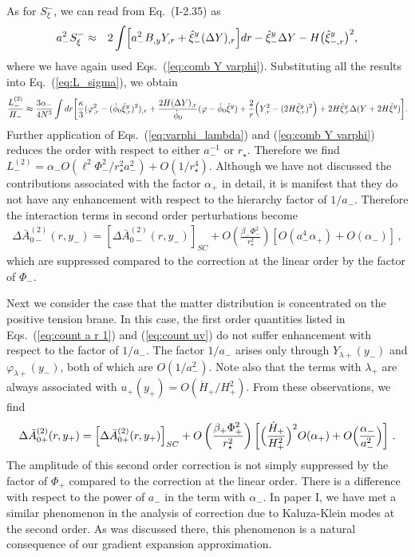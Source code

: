\documentclass[a4paper,showpacs,preprintnumbers,amsmath,amssymb]{revtex4}
\begin{document}
As for $S_\xi^-$, we can read from Eq.~(I-2.35) as 
\begin{eqnarray}
 a_{-}^2S_\xi^-
&\approx & 
 2  \int \Bigl[ a_{-}^2  B_{,y} Y_{,r}  
 + \hat \xi^y_- (\Delta Y)_{,r} \Bigr] dr 
 -   \hat\xi_{-}^y \Delta Y   
 - H  \bigl( {\hat\xi_{-,r}^y} \bigr)^2 ,
\end{eqnarray}
where we have again used Eqs.~(\ref{eq:comb Y varphi}).
Substituting all the results into Eq.~(\ref{eq:L_sigma}), we obtain 
\begin{eqnarray} 
\frac{L_-^{(2)}}{H_-} 
\approx 
 \frac{3\alpha_- }{ 4 N^3 }
 \int dr \biggl[
   \frac{ \kappa}{3} ( \varphi_{,r}^2 -  (\dot\phi_0 \hat\xi^y_{,r})^2)_{,r}
 + \frac{2H (\Delta Y)_{,r}}{\dot\phi_0} (\varphi - \dot\phi_0 \hat\xi^y) 
 + \frac{2}{r} \Bigl( Y_{,r}^2 -  (2H \hat \xi^y_{,r})^2 \Bigr)
 + 2H \hat\xi^y_{,r} \Delta (Y+2H\hat\xi^y)
 \biggr] .
\end{eqnarray}
Further application of Eqs.~(\ref{eq:varphi_lambda}) and (\ref{eq:comb Y varphi}) reduces the order with respect to either $a_-^{-1}$ or $r_\star$. 
Therefore we find 
$L_-^{(2)}= \alpha_- O(\ell^2 \Phi_-^2/r_{\star}^2 a_-^2)+O(1/r_{\star}^4)$. 
Although we have not discussed the contributions associated with the factor $\alpha_+$ in detail, it is manifest that they do not have any enhancement with respect to the hierarchy factor of $1/a_-$. 
Therefore the interaction terms in second order perturbations become
\begin{eqnarray}
    \Delta  \bar A^{(2)}_{0-}(r,y_-) 
 = \left[\Delta \bar A^{(2)}_{0-}(r,y_-)\right]_{SC}
 +  O\left( \frac{\beta_- \Phi_-^2}{ r_\star^{ 2}} \right)
    \left[O(a^4_-  \alpha_+) + O(\alpha_-)\right]\,,
\label{eq:barA2}
\end{eqnarray}
which are suppressed compared to the correction at the linear order by the factor of $\Phi_-$. 


Next we consider the case that the matter distribution is concentrated on the positive tension brane. 
In this case, the first order quantities listed in
Eqs.~(\ref{eq:count a r 1}) and (\ref{eq:count uv}) do not suffer enhancement with respect to the factor of $1/a_-$. 
The factor $1/a_-$ arises only through $Y_{ \lambda +}(y_-)$ and $\varphi_{ \lambda +}(y_-)$, both of which are $O(1/a_-^2)$. 
Note also that the terms with $\lambda_+$ are always associated with $u_+(y_+)=O(\dot H_+/H_+^2)$. 
From these observations, we find 
\begin{eqnarray}
    \Delta  \bar A^{(2)}_{0+}(r,y_+) 
 = \left[\Delta \bar A^{(2)}_{0+}(r,y_+)\right]_{SC}
 + O\left( \frac{\beta_+ \Phi_+^2}{ r_\star^{ 2}} \right)
     \left[  \Bigl(\frac{\dot H_+}{ H_+^2} \Bigr)^2  O( \alpha_+ )
     +  O \Bigl( \frac{ \alpha_- }{a^2_-} \Bigr)\right]    \,. 
\label{eq:A2+}
\end{eqnarray}
The amplitude of this second order correction is not simply suppressed by the factor of $\Phi_+$ compared to the correction at the linear order. 
There is a difference with respect to the power of $a_-$ in the term with $\alpha_-$. 
In paper I, we have met a similar phenomenon in the analysis of correction due to Kaluza-Klein modes at the second order. As was discussed there, this phenomenon is a natural consequence of our gradient expansion approximation. 
\end{document}
